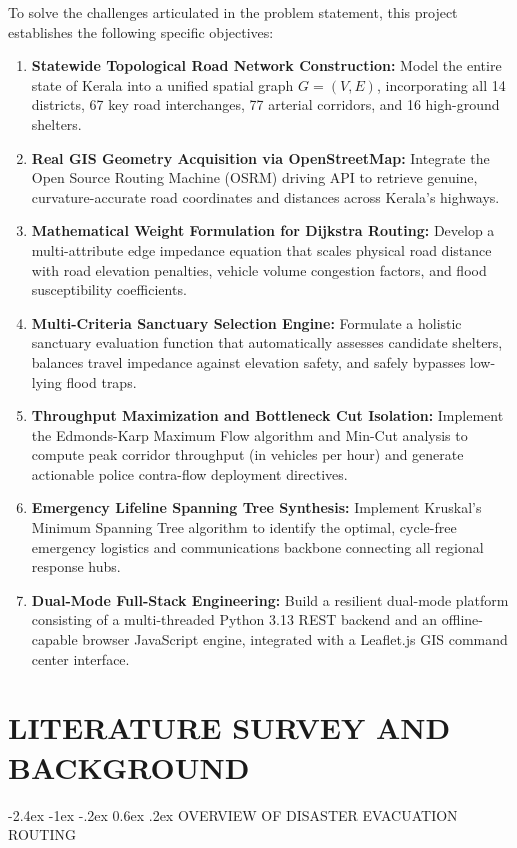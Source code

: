 \documentclass[12pt,oneside]{report}
\makeatletter
\renewcommand{\section}{\@startsection{section}{1}{\z@}%
  {-2.4ex \@plus -1ex \@minus -.2ex}%
  {0.6ex \@plus .2ex}%
  {\normalfont\large\bfseries}}
\newcommand{\chapterpage}[1]{\chapter{#1}}
\makeatother
\begin{document}
To solve the challenges articulated in the problem statement, this project establishes the following specific objectives:

\begin{enumerate}
    \item \textbf{Statewide Topological Road Network Construction:} Model the entire state of Kerala into a unified spatial graph $G = (V, E)$, incorporating all 14 districts, 67 key road interchanges, 77 arterial corridors, and 16 high-ground shelters.
    \item \textbf{Real GIS Geometry Acquisition via OpenStreetMap:} Integrate the Open Source Routing Machine (OSRM) driving API to retrieve genuine, curvature-accurate road coordinates and distances across Kerala's highways.
    \item \textbf{Mathematical Weight Formulation for Dijkstra Routing:} Develop a multi-attribute edge impedance equation that scales physical road distance with road elevation penalties, vehicle volume congestion factors, and flood susceptibility coefficients.
    \item \textbf{Multi-Criteria Sanctuary Selection Engine:} Formulate a holistic sanctuary evaluation function that automatically assesses candidate shelters, balances travel impedance against elevation safety, and safely bypasses low-lying flood traps.
    \item \textbf{Throughput Maximization and Bottleneck Cut Isolation:} Implement the Edmonds-Karp Maximum Flow algorithm and Min-Cut analysis to compute peak corridor throughput (in vehicles per hour) and generate actionable police contra-flow deployment directives.
    \item \textbf{Emergency Lifeline Spanning Tree Synthesis:} Implement Kruskal's Minimum Spanning Tree algorithm to identify the optimal, cycle-free emergency logistics and communications backbone connecting all regional response hubs.
    \item \textbf{Dual-Mode Full-Stack Engineering:} Build a resilient dual-mode platform consisting of a multi-threaded Python 3.13 REST backend and an offline-capable browser JavaScript engine, integrated with a Leaflet.js GIS command center interface.
\end{enumerate}

\clearpage

\chapterpage{LITERATURE SURVEY AND BACKGROUND}

\section{OVERVIEW OF DISASTER EVACUATION ROUTING}
\end{document}

